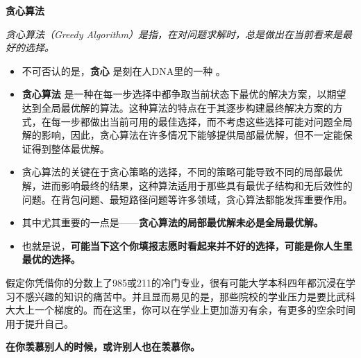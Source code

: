 \documentclass{beamer}	%
\theoremstyle{plain}
\theoremstyle{definition}
\theoremstyle{remark}
\numberwithin{equation}{section}
\begin{document}
\begin{frame}
	\begin{LARGE}
		\textbf{贪心算法}
	\end{LARGE}
	\vspace{1cm}

	\textit{贪心算法（Greedy Algorithm）是指，在对问题求解时，总是做出在当前看来是最好的选择。}
	\vspace{0.5cm}

	\begin{itemize}
		\item 不可否认的是，\textbf{贪心} 是刻在人DNA里的一种 。
		\vspace{0.25cm}

		\item \textbf{贪心算法} 是一种在每一步选择中都争取当前状态下最优的解决方案，以期望达到全局最优解的算法。这种算法的特点在于其逐步构建最终解决方案的方式，在每一步都做出当前可用的最佳选择，而不考虑这些选择可能对问题全局解的影响，因此，贪心算法在许多情况下能够提供局部最优解，但不一定能保证得到整体最优解。
		
	\end{itemize}

\end{frame}

\begin{frame}
	\begin{itemize}
		\item 贪心算法的关键在于贪心策略的选择，不同的策略可能导致不同的局部最优解，进而影响最终的结果，这种算法适用于那些具有最优子结构和无后效性的问题。在背包问题、最短路径问题等许多领域，贪心算法都能发挥重要作用。
		\vspace{0.25cm}

		\item 其中尤其重要的一点是——\textbf{贪心算法的局部最优解未必是全局最优解。}
		\vspace{0.25cm}

		\item 也就是说，\textbf{可能当下这个你填报志愿时看起来并不好的选择，可能是你人生里最优的选择。}
	\end{itemize}

\end{frame}

\begin{frame}
	假定你凭借你的分数上了985或211的冷门专业，很有可能大学本科四年都沉浸在学习不感兴趣的知识的痛苦中。并且显而易见的是，那些院校的学业压力是要比武科大大上一个梯度的。而在这里，你可以在学业上更加游刃有余，有更多的空余时间用于提升自己。
	\vspace{0.5cm}

	\textbf{在你羡慕别人的时候，或许别人也在羡慕你。}
\end{frame}
\end{document}
